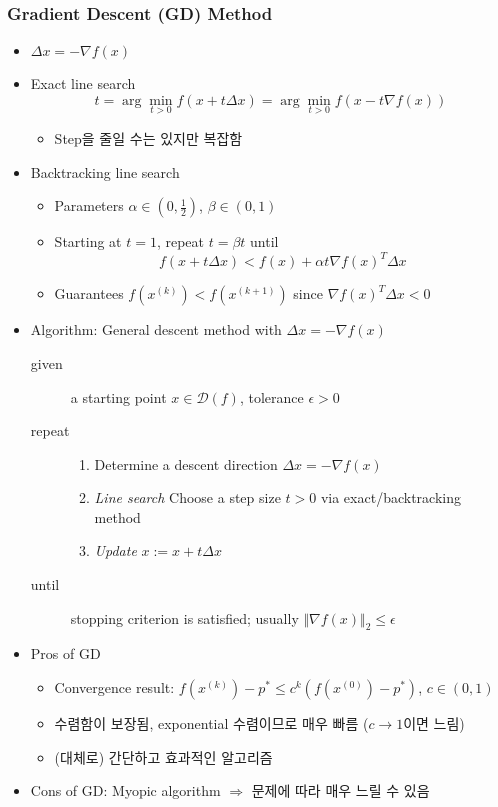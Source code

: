 \subsubsection*{Gradient Descent (GD) Method}
\begin{itemize}
    \item $\Delta x = -\nabla f(x)$
    \item Exact line search
    \begin{equation}
        t = \arg\min_{t>0}f(x+t\Delta x) = \arg\min_{t>0}f(x-t\nabla f(x))
    \end{equation}
    \begin{itemize}
        \item Step을 줄일 수는 있지만 복잡함
    \end{itemize}
    \item Backtracking line search
    \begin{itemize}
        \item Parameters $\alpha\in\left(0,\frac{1}{2}\right)$, $\beta\in(0,1)$
        \item Starting at $t=1$, repeat $t=\beta t$ until
        \begin{equation}
            f(x+t\Delta x) < f(x)+\alpha t\nabla f(x)^T\Delta x
        \end{equation}
        \item Guarantees $f(x^{(k)})<f(x^{(k+1)})$ since $\nabla f(x)^T\Delta x<0$
    \end{itemize}
    \item Algorithm: General descent method with $\Delta x = -\nabla f(x)$
    \begin{description}
        \item[given] a starting point $x\in\mathcal{D}(f)$, tolerance $\epsilon>0$
        \item[repeat] \phantom{}
        \begin{enumerate}
            \item Determine a descent direction $\Delta x=-\nabla f(x)$
            \item \textit{Line search} Choose a step size $t>0$ via exact/backtracking method
            \item \textit{Update} $x:=x+t\Delta x$
        \end{enumerate}
        \item[until] stopping criterion is satisfied; usually $\Vert\nabla f(x)\Vert_2\leq\epsilon$
    \end{description}
    \item Pros of GD
    \begin{itemize}
        \item Convergence result: $f(x^{(k)})-p^\ast\leq c^k\left(f(x^{(0)})-p^\ast\right)$, $c\in(0,1)$
        \item 수렴함이 보장됨, exponential 수렴이므로 매우 빠름 ($c\rightarrow 1$이면 느림)
        \item (대체로) 간단하고 효과적인 알고리즘
    \end{itemize}
    \item Cons of GD: Myopic algorithm $\Rightarrow$ 문제에 따라 매우 느릴 수 있음
\end{itemize}

